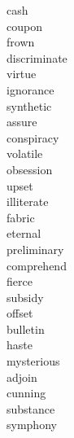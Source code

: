 \documentclass[a4paper, 10pt]{ctexart}
\begin{document}
\begin{multicols*}{2}
\begin{description}
\item[cash]

\item[coupon]

\item[frown]

\item[discriminate]

\item[virtue]

\item[ignorance]

\item[synthetic]

\item[assure]

\item[conspiracy]

\item[volatile]

\item[obsession]

\item[upset]

\item[illiterate]

\item[fabric]

\item[eternal]

\item[preliminary]

\item[comprehend]

\item[fierce]

\item[subsidy]

\item[offset]

\item[bulletin]

\item[haste]

\item[mysterious]

\item[adjoin]

\item[cunning]

\item[substance]

\item[symphony]


\end{description}
\end{multicols*}
\end{document}
